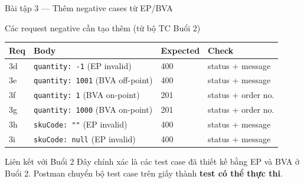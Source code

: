 \documentclass[aspectratio=169,10pt]{beamer}
\begin{document}
\begin{frame}[fragile]{Bài tập 3 --- Thêm negative cases từ EP/BVA}
  \begin{block}{Các request negative cần tạo thêm (từ bộ TC Buổi 2)}
  \end{block}

  \begin{center}
  \scriptsize
  \setlength{\tabcolsep}{3pt}
  \begin{tabular}{p{0.9cm}p{3.8cm}p{2.2cm}p{2.0cm}}
    \toprule
    \textbf{Req} & \textbf{Body} & \textbf{Expected} & \textbf{Check} \\
    \midrule
    3d & \texttt{quantity: -1} (EP invalid) & 400 & status + message \\
    3e & \texttt{quantity: 1001} (BVA off-point) & 400 & status + message \\
    3f & \texttt{quantity: 1} (BVA on-point) & 201 & status + order no. \\
    3g & \texttt{quantity: 1000} (BVA on-point) & 201 & status + order no. \\
    3h & \texttt{skuCode: ""} (EP invalid) & 400 & status + message \\
    3i & \texttt{skuCode: null} (EP invalid) & 400 & status + message \\
    \bottomrule
  \end{tabular}
  \end{center}

  \begin{exampleblock}{Liên kết với Buổi 2}
    Đây chính xác là các test case đã thiết kế bằng EP và BVA ở Buổi 2.
    Postman chuyển bộ test case trên giấy thành \textbf{test có thể thực thi}.
  \end{exampleblock}
\end{frame}
\end{document}
